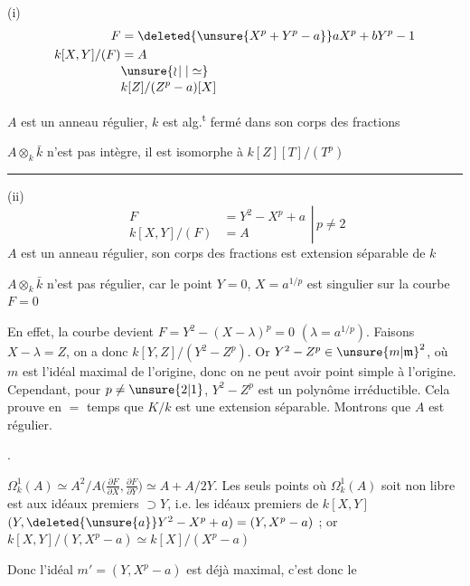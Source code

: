 (i)
\[
\begin{aligned}
 F&=\deleted{\unsure{X^p+Y^p-a}}aX^p+bY^p-1\\
 k[X,Y]/(F)&=A\\[-2pt]
 &\unsure{\wr\!\mid|\simeq}\\[-2pt]
 &k[Z]/(Z^p-a)[X]
\end{aligned}
\]

 $A$ est un anneau régulier,  $k$ est alg.\textsuperscript{t} fermé dans son corps des fractions

$A\otimes_k\bar k$ n'est pas intègre, il est isomorphe à $k[Z][T]/(T^p)$

\noindent\rule{.28\linewidth}{.3pt}

(ii)
\[
\left.
\begin{aligned}
 F&=Y^2-X^p+a\\
 k[X,Y]/(F)&=A
\end{aligned}
\right|\,p\ne2
\]
$A$ est un anneau régulier,  son corps des fractions est extension séparable de $k$

$A\otimes_k\bar k$ n'est pas régulier, car le point $Y=0$, $X=a^{1/p}$ est singulier sur la courbe $F=0$

En effet, la courbe devient $F=Y^2-(X-\lambda)^p=0$ \quad$(\lambda=a^{1/p})$. Faisons $X-\lambda=Z$, on a donc $k[Y,Z]/(Y^2-Z^p)$. Or $Y^2-Z^p\in{\unsure{m|\mathfrak m}}^{2}$, où $m$ est l'idéal maximal de l'origine, donc on ne peut avoir point simple à l'origine. Cependant, pour $p\ne\unsure{2|1}$, $Y^2-Z^p$ est un polynôme irréductible. Cela prouve en $=$ temps que $K/k$ est une extension séparable. Montrons que $A$ est régulier.

  .

$\Omega^1_k(A)\simeq A^2/A\bigl(\frac{\partial F}{\partial X},\frac{\partial F}{\partial Y}\bigr)\simeq A+A/2Y$. Les seuls points où $\Omega^1_k(A)$ soit non libre est aux idéaux premiers $\supset Y$, i.e. les idéaux premiers de $k[X,Y]$  $(Y,\deleted{\unsure{a}}Y^2-X^p+a)=(Y,X^p-a)$ ; or $k[X,Y]/(Y,X^p-a)\simeq k[X]/(X^{p}-a)$

Donc l'idéal $m'=(Y,X^p-a)$ est déjà maximal, c'est donc le


